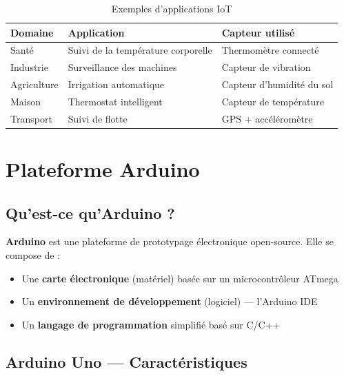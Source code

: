 \documentclass[12pt, a4paper]{article}
\begin{document}
\begin{table}[H]
    \centering
    \caption{Exemples d'applications IoT}
    \begin{tabular}{lll}
        \toprule
        \textbf{Domaine} & \textbf{Application} & \textbf{Capteur utilisé} \\
        \midrule
        Santé      & Suivi de la température corporelle & Thermomètre connecté \\
        Industrie  & Surveillance des machines            & Capteur de vibration \\
        Agriculture & Irrigation automatique              & Capteur d'humidité du sol \\
        Maison     & Thermostat intelligent                & Capteur de température \\
        Transport  & Suivi de flotte                       & GPS + accéléromètre \\
        \bottomrule
    \end{tabular}
\end{table}

\section{Plateforme Arduino}

\subsection{Qu'est-ce qu'Arduino ?}

\textbf{Arduino} est une plateforme de prototypage électronique open-source. Elle se compose de :

\begin{itemize}
    \item Une \textbf{carte électronique} (matériel) basée sur un microcontrôleur ATmega
    \item Un \textbf{environnement de développement} (logiciel) — l'Arduino IDE
    \item Un \textbf{langage de programmation} simplifié basé sur C/C++
\end{itemize}

\subsection{Arduino Uno — Caractéristiques}
\end{document}
